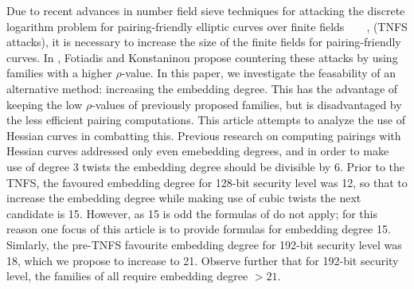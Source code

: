 Due to recent advances in number field sieve techniques for attacking the discrete logarithm problem for pairing-friendly elliptic curves over finite fields~\cite{2013/jouxP}~\cite{2016/KB}~\cite{2015/BGGM}~\cite{2015/BGK}, (TNFS attacks),
it is necessary to increase the size of the finite fields for pairing-friendly curves.
In \cite{2018/FK}, Fotiadis and Konstaninou propose countering these attacks by using families with a higher $\rho$-value. In this paper, we investigate the feasability of an alternative method: increasing the embedding degree.
This has the advantage of keeping the low $\rho$-values of previously proposed families, but is disadvantaged by the less efficient pairing computations.
This article attempts to analyze the use of Hessian curves in combatting this.
Previous research on computing pairings with  Hessian curves addressed only even emebedding degrees, and in order to make use of degree 3 twists the embedding degree should be divisible by 6. 
Prior to the TNFS, the favoured embedding degree for 128-bit security level was 12, 
so that to increase the embedding degree while making use of cubic twists the next
candidate is 15. However, as 15 is odd the formulas of \cite{2010/Gu} do not apply;
for this reason one focus of this article is to provide formulas for embedding degree 15. Simlarly, the pre-TNFS favourite embedding degree for 192-bit security level was 18, which we propose to increase to 21.
Observe further that for 192-bit security level, the families of \cite{2018/FK} all require embedding degree $>21$.




